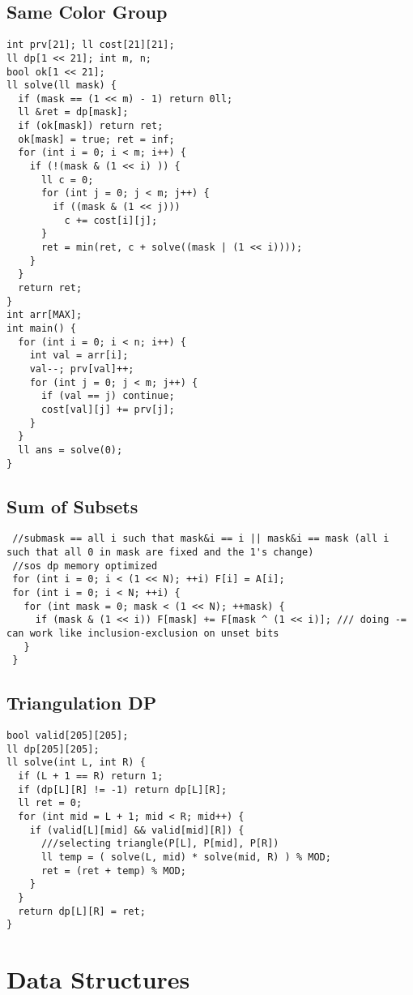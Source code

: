 \documentclass[10pt,a4paper,onesided]{article}
\begin{document}
\begin{multicols*}{3}
\begin{lstlisting}
\end{lstlisting}
\subsection{Same Color Group}
\begin{lstlisting}
int prv[21]; ll cost[21][21];
ll dp[1 << 21]; int m, n;
bool ok[1 << 21];
ll solve(ll mask) {
  if (mask == (1 << m) - 1) return 0ll;
  ll &ret = dp[mask];
  if (ok[mask]) return ret;
  ok[mask] = true; ret = inf;
  for (int i = 0; i < m; i++) {
    if (!(mask & (1 << i) )) {
      ll c = 0;
      for (int j = 0; j < m; j++) {
        if ((mask & (1 << j)))
          c += cost[i][j];
      }
      ret = min(ret, c + solve((mask | (1 << i))));
    }
  }
  return ret;
}
int arr[MAX];
int main() {
  for (int i = 0; i < n; i++) {
    int val = arr[i];
    val--; prv[val]++;
    for (int j = 0; j < m; j++) {
      if (val == j) continue;
      cost[val][j] += prv[j];
    }
  }
  ll ans = solve(0);
}

\end{lstlisting}
\subsection{Sum of Subsets}
\begin{lstlisting}
 //submask == all i such that mask&i == i || mask&i == mask (all i such that all 0 in mask are fixed and the 1's change)
 //sos dp memory optimized
 for (int i = 0; i < (1 << N); ++i) F[i] = A[i];
 for (int i = 0; i < N; ++i) {
   for (int mask = 0; mask < (1 << N); ++mask) {
     if (mask & (1 << i)) F[mask] += F[mask ^ (1 << i)]; /// doing -= can work like inclusion-exclusion on unset bits
   }
 } 
\end{lstlisting}
\subsection{Triangulation DP}
\begin{lstlisting}
bool valid[205][205];
ll dp[205][205];
ll solve(int L, int R) {
  if (L + 1 == R) return 1;
  if (dp[L][R] != -1) return dp[L][R];
  ll ret = 0;
  for (int mid = L + 1; mid < R; mid++) {
    if (valid[L][mid] && valid[mid][R]) {
      ///selecting triangle(P[L], P[mid], P[R])
      ll temp = ( solve(L, mid) * solve(mid, R) ) % MOD;
      ret = (ret + temp) % MOD;
    }
  }
  return dp[L][R] = ret;
}
\end{lstlisting}
\section{Data Structures}

\end{multicols*}
\end{document}
